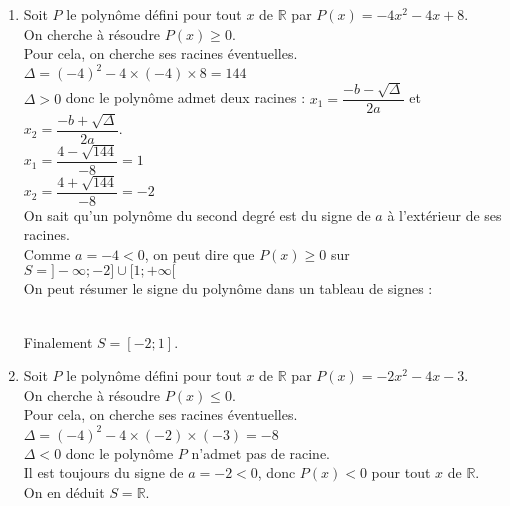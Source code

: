 \documentclass[a4paper,11pt,exos]{nsi} %
\begin{document}
\begin{enumerate}
    \item Soit $P$ le polynôme défini pour tout $x$ de $\mathbb R$ par $P(x)=-4x^2-4x+8$.\\On cherche à résoudre $P(x)\geq 0$.\\Pour cela, on cherche ses racines éventuelles.\\$\Delta = (-4)^2-4\times(-4)\times8=144$\\$\Delta>0$ donc  le polynôme admet deux racines : $x_1 = \dfrac{-b-\sqrt{\Delta}}{2a}$ et $x_2 = \dfrac{-b+\sqrt{\Delta}}{2a}$.\\$x_1 =\dfrac{4-\sqrt{144}}{-8}=1$\\$x_2 =\dfrac{4+\sqrt{144}}{-8}=-2$\\On sait qu'un polynôme du second degré est du signe de $a$ à l'extérieur de ses racines.\\Comme $a=-4<0$, on peut dire que $P(x)\geq 0$ sur $S=]-\infty;-2]\cup[1;+\infty[$\\On peut résumer le signe du polynôme dans un tableau de signes :\\
    \\ 
    
    Finalement $S=[-2;1]$.
    \item Soit $P$ le polynôme défini pour tout $x$ de $\mathbb R$ par $P(x)=-2x^2-4x-3$.\\On cherche à résoudre $P(x)\leq 0$.\\Pour cela, on cherche ses racines éventuelles.\\$\Delta = (-4)^2-4\times(-2)\times(-3)=-8$\\$\Delta<0$ donc le polynôme $P$ n'admet pas de racine.\\ Il est toujours du signe de $a=-2<0$, donc $P(x)<0$ pour tout $x$ de $\mathbb{R}$.\\ On en déduit $S=\mathbb{R}$.
    

\end{enumerate}
\end{document}
